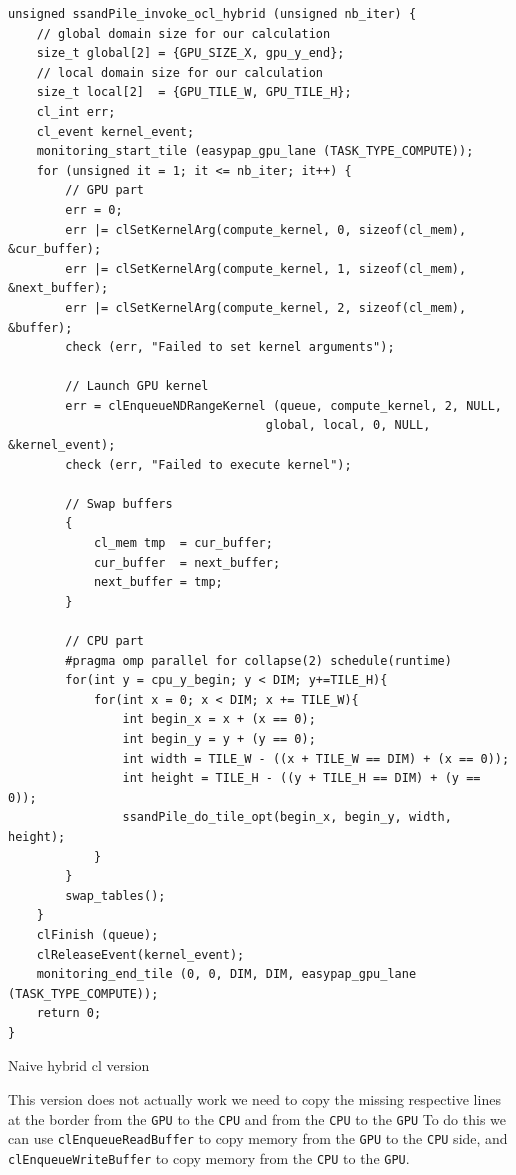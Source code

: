 \documentclass{report}
\def\CPU{\texttt{CPU}}
\def\GPU{\texttt{GPU}}
\newcommand{\code}[1]{\texttt{#1}}
\begin{document}
\begin{listing}[H]
	\begin{verbatim}
unsigned ssandPile_invoke_ocl_hybrid (unsigned nb_iter) {
    // global domain size for our calculation
    size_t global[2] = {GPU_SIZE_X, gpu_y_end}; 
    // local domain size for our calculation
    size_t local[2]  = {GPU_TILE_W, GPU_TILE_H}; 
    cl_int err;
    cl_event kernel_event;
    monitoring_start_tile (easypap_gpu_lane (TASK_TYPE_COMPUTE));
    for (unsigned it = 1; it <= nb_iter; it++) {
        // GPU part
        err = 0;
        err |= clSetKernelArg(compute_kernel, 0, sizeof(cl_mem), &cur_buffer);
        err |= clSetKernelArg(compute_kernel, 1, sizeof(cl_mem), &next_buffer);
        err |= clSetKernelArg(compute_kernel, 2, sizeof(cl_mem), &buffer);
        check (err, "Failed to set kernel arguments");

        // Launch GPU kernel
        err = clEnqueueNDRangeKernel (queue, compute_kernel, 2, NULL, 
                                    global, local, 0, NULL, &kernel_event);
        check (err, "Failed to execute kernel");

        // Swap buffers
        {
            cl_mem tmp  = cur_buffer;
            cur_buffer  = next_buffer;
            next_buffer = tmp;
        }

        // CPU part
        #pragma omp parallel for collapse(2) schedule(runtime)
        for(int y = cpu_y_begin; y < DIM; y+=TILE_H){
            for(int x = 0; x < DIM; x += TILE_W){
                int begin_x = x + (x == 0);
                int begin_y = y + (y == 0);
                int width = TILE_W - ((x + TILE_W == DIM) + (x == 0));
                int height = TILE_H - ((y + TILE_H == DIM) + (y == 0));
                ssandPile_do_tile_opt(begin_x, begin_y, width, height);
            }
        }
        swap_tables();
    }
    clFinish (queue);
    clReleaseEvent(kernel_event);
    monitoring_end_tile (0, 0, DIM, DIM, easypap_gpu_lane (TASK_TYPE_COMPUTE));
    return 0;
}
\end{verbatim}
	\caption{Naive hybrid cl version}
\end{listing}

This version does not actually work we need to copy the missing respective lines at the border
from the \GPU{} to the \CPU{} and from the \CPU{} to the \GPU{}
To do this we can use \code{clEnqueueReadBuffer} to copy memory from the \GPU{} to the \CPU{} side,
and \code{clEnqueueWriteBuffer} to copy memory from the \CPU{} to the \GPU{}.
\end{document}
